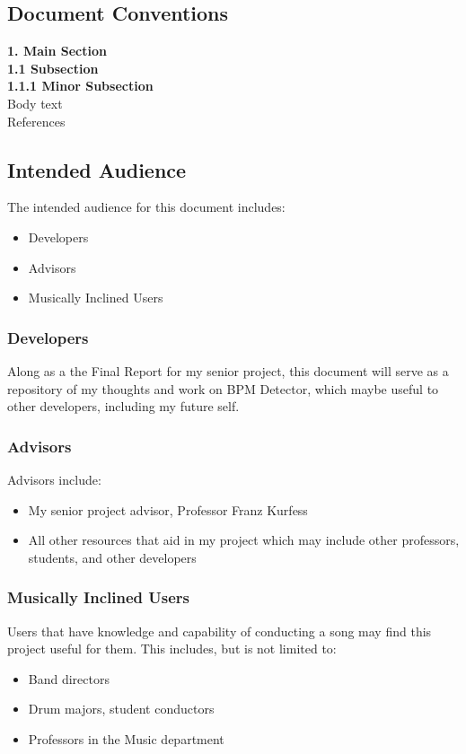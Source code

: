 \documentclass[12pt]{article}
\begin{document}
\subsection{Document Conventions} 
\begin{center}
\Large \textbf{1. Main Section} \\
\large \textbf{1.1 Subsection} \\
\normalsize \textbf{1.1.1 Minor Subsection} \\
\normalsize Body text \\
\tiny References \\
\end{center}

\subsection{Intended Audience}
The intended audience for this document includes:
\begin{itemize}
	\item Developers
    \item Advisors
    \item Musically Inclined Users
 \end{itemize}

\subsubsection{Developers}
Along as a the Final Report for my senior project, this document will serve as a repository of my thoughts and work on BPM Detector, which maybe useful to other developers, including my future self.

\subsubsection{Advisors}
Advisors include:
\begin{itemize}
	\item My senior project advisor, Professor Franz Kurfess
    \item All other resources that aid in my project which may include other professors, students, and other developers
 \end{itemize}

\subsubsection{Musically Inclined Users}
Users that have knowledge and capability of conducting a song may find this project useful for them. This includes, but is not limited to:
\begin{itemize}
	\item Band directors
    \item Drum majors, student conductors
    \item Professors in the Music department
 \end{itemize}
\end{document}
